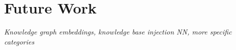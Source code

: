 \section{Future Work}
\label{section:FutureWork}


\textit{Knowledge graph embeddings, knowledge base injection NN, more specific categories}